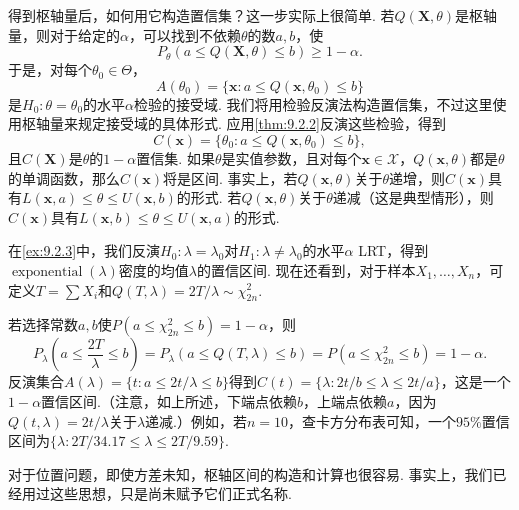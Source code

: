 得到枢轴量后，如何用它构造置信集？这一步实际上很简单. 若$Q(\boldsymbol X,\theta)$是枢轴量，则对于给定的$\alpha$，可以找到不依赖$\theta$的数$a,b$，使
$$P_\theta(a\le Q(\boldsymbol X,\theta)\le b)\ge1-\alpha.$$
于是，对每个$\theta_0\in\Theta$，
\begin{equation}\label{eq:9.2.12}
A(\theta_0)=\{\boldsymbol x:a\le Q(\boldsymbol x,\theta_0)\le b\}
\end{equation}
是$H_0:\theta=\theta_0$的水平$\alpha$检验的接受域. 我们将用检验反演法构造置信集，不过这里使用枢轴量来规定接受域的具体形式. 应用\autoref{thm:9.2.2}反演这些检验，得到
\begin{equation}\label{eq:9.2.13}
C(\boldsymbol x)=\{\theta_0:a\le Q(\boldsymbol x,\theta_0)\le b\},
\end{equation}
且$C(\boldsymbol X)$是$\theta$的$1-\alpha$置信集. 如果$\theta$是实值参数，且对每个$\boldsymbol x\in\mathcal X$，$Q(\boldsymbol x,\theta)$都是$\theta$的单调函数，那么$C(\boldsymbol x)$将是区间. 事实上，若$Q(\boldsymbol x,\theta)$关于$\theta$递增，则$C(\boldsymbol x)$具有$L(\boldsymbol x,a)\le\theta\le U(\boldsymbol x,b)$的形式. 若$Q(\boldsymbol x,\theta)$关于$\theta$递减（这是典型情形），则$C(\boldsymbol x)$具有$L(\boldsymbol x,b)\le\theta\le U(\boldsymbol x,a)$的形式.
\begin{example}[续\autoref{ex:9.2.8}]\label{ex:9.2.9}
在\autoref{ex:9.2.3}中，我们反演$H_0:\lambda=\lambda_0$对$H_1:\lambda\ne\lambda_0$的水平$\alpha$ LRT，得到$\operatorname{exponential}(\lambda)$密度的均值$\lambda$的置信区间. 现在还看到，对于样本$X_1,\ldots,X_n$，可定义$T=\sum X_i$和$Q(T,\lambda)=2T/\lambda\sim\chi^2_{2n}$.

若选择常数$a,b$使$P(a\le\chi^2_{2n}\le b)=1-\alpha$，则
$$P_\lambda\left(a\le\frac{2T}\lambda\le b\right)=P_\lambda(a\le Q(T,\lambda)\le b)=P(a\le\chi^2_{2n}\le b)=1-\alpha.$$
反演集合$A(\lambda)=\{t:a\le2t/\lambda\le b\}$得到$C(t)=\{\lambda:2t/b\le\lambda\le2t/a\}$，这是一个$1-\alpha$置信区间.（注意，如上所述，下端点依赖$b$，上端点依赖$a$，因为$Q(t,\lambda)=2t/\lambda$关于$\lambda$递减.）例如，若$n=10$，查卡方分布表可知，一个$95\%$置信区间为$\{\lambda:2T/34.17\le\lambda\le2T/9.59\}$.
\end{example}
对于位置问题，即使方差未知，枢轴区间的构造和计算也很容易. 事实上，我们已经用过这些思想，只是尚未赋予它们正式名称.
